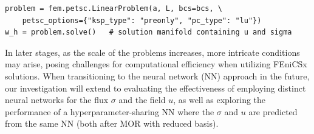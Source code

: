 \begin{lstlisting}[frame=single, caption={Defining and solving the porblem}]
problem = fem.petsc.LinearProblem(a, L, bcs=bcs, \
    petsc_options={"ksp_type": "preonly", "pc_type": "lu"})
w_h = problem.solve()   # solution manifold containing u and sigma
\end{lstlisting}

In later stages, as the scale of the problems increases, more intricate conditions may arise, posing challenges for computational efficiency when utilizing FEniCSx solutions. When transitioning to the neural network (NN) approach in the future, our investigation will extend to evaluating the effectiveness of employing distinct neural networks for the flux $\sigma$ and the field $u$, as well as exploring the performance of a hyperparameter-sharing NN where the $\sigma$ and $u$ are predicted from the same NN (both after MOR with reduced basis).



